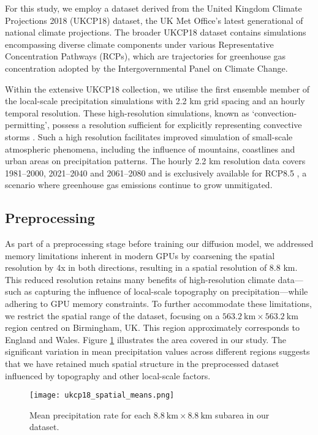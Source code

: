 \documentclass[ oneside,%
                    author={George Herbert},
                    degree={MSci},
                     title={Diffusion Models for Time-Evolving Precipitation Fields},
                  subtitle={}]{dissertation}
\begin{document}
For this study, we employ a dataset derived from the United Kingdom Climate Projections 2018 (UKCP18) \cite{MO_UKCP18_Dataset} dataset, the UK Met Office's latest generational of national climate projections. The broader UKCP18 dataset contains simulations encompassing diverse climate components under various Representative Concentration Pathways (RCPs), which are trajectories for greenhouse gas concentration adopted by the Intergovernmental Panel on Climate Change.

Within the extensive UKCP18 collection, we utilise the first ensemble member of the local-scale precipitation simulations with 2.2 km grid spacing and an hourly temporal resolution. These high-resolution simulations, known as `convection-permitting', possess a resolution sufficient for explicitly representing convective storms \cite{MO_CPM}. Such a high resolution facilitates improved simulation of small-scale atmospheric phenomena, including the influence of mountains, coastlines and urban areas on precipitation patterns. The hourly 2.2 km resolution data covers 1981--2000, 2021--2040 and 2061--2080 and is exclusively available for RCP8.5 \cite{MO_RCP_Guidance}, a scenario where greenhouse gas emissions continue to grow unmitigated.

\subsection{Preprocessing}

As part of a preprocessing stage before training our diffusion model, we addressed memory limitations inherent in modern GPUs by coarsening the spatial resolution by 4x in both directions, resulting in a spatial resolution of 8.8 km. This reduced resolution retains many benefits of high-resolution climate data---such as capturing the influence of local-scale topography on precipitation---while adhering to GPU memory constraints. To further accommodate these limitations, we restrict the spatial range of the dataset, focusing on a $563.2\ \mathrm{km}\times 563.2\ \mathrm{km}$ region centred on Birmingham, UK. This region approximately corresponds to England and Wales. Figure \ref{fig:ukcp18_spatial_means} illustrates the area covered in our study. The significant variation in mean precipitation values across different regions suggests that we have retained much spatial structure in the preprocessed dataset influenced by topography and other local-scale factors.

\begin{figure}[htbp]
      \centering
      \texttt{[image: ukcp18\_spatial\_means.png]}
      \caption{Mean precipitation rate for each $8.8\ \mathrm{km}\times 8.8\ \mathrm{km}$ subarea in our dataset.}
      \label{fig:ukcp18_spatial_means}
\end{figure}
\end{document}
